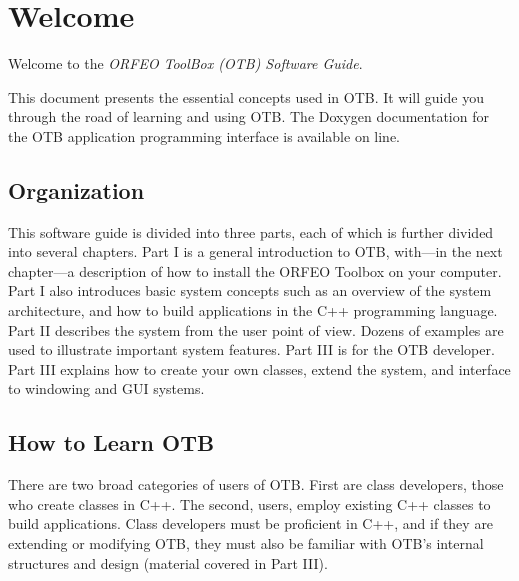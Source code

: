 \chapter{Welcome}
\label{chapter:Welcome}

Welcome to the \emph{ORFEO ToolBox (OTB) Software Guide}.

This document presents the essential concepts used in OTB. It will
guide you through the road of learning and using OTB. The Doxygen
documentation for the OTB application programming interface is
available on line.

\section{Organization}
\label{sec:Organization}

This software guide is divided into three parts, each of which is further
divided into several chapters. Part I is a general introduction to OTB,
with---in the next chapter---a description of how to install the ORFEO
Toolbox on your computer. Part I also
introduces basic system concepts such as an overview of the system
architecture, and how to build applications in the C++ programming
language. Part II describes the system from the user point of view. Dozens
of examples are used to illustrate important system features. Part III is for
the OTB developer. Part III explains how to create your own classes, extend
the system, and interface to windowing and GUI systems.

\section{How to Learn OTB}
\label{sec:HowToLearnOTB}

There are two broad categories of users of OTB. First are class
developers, those who create classes in C++. The second, users, employ
existing C++ classes to build applications. Class developers must be
proficient in C++, and if they are extending or modifying OTB, they
must also be familiar with OTB's internal structures and design
(material covered in Part III). 

